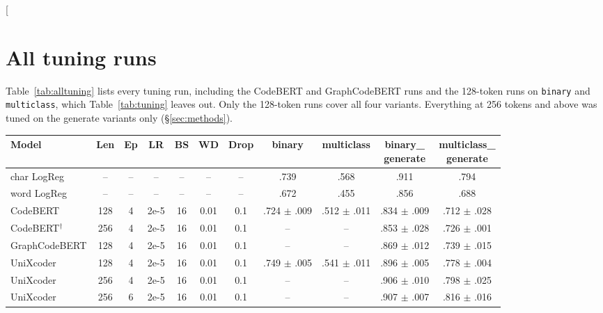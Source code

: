 \documentclass[11pt]{article}
\begin{document}
\twocolumn[{%
\section{All tuning runs}
\label{app:tuning}

Table~\ref{tab:alltuning} lists every tuning run, including the CodeBERT and GraphCodeBERT runs and the 128-token runs on \texttt{binary} and \texttt{multiclass}, which Table~\ref{tab:tuning} leaves out. Only the 128-token runs cover all four variants. Everything at 256 tokens and above was tuned on the generate variants only (\S\ref{sec:methods}).

\smallskip
{\centering
  \captionsetup{type=table}
  \small
  \setlength{\tabcolsep}{3.5pt}
  \begin{tabular}{lcccccccccc}
    \hline
    \textbf{Model} & \textbf{Len} & \textbf{Ep} & \textbf{LR} & \textbf{BS} & \textbf{WD} & \textbf{Drop} & \textbf{binary} & \textbf{multiclass} & \makecell{\textbf{binary\_}\\\textbf{generate}} & \makecell{\textbf{multiclass\_}\\\textbf{generate}} \\
    \hline
    char LogReg            & --  & -- & --   & -- & --   & --  & .739            & .568            & .911            & .794 \\
    word LogReg            & --  & -- & --   & -- & --   & --  & .672            & .455            & .856            & .688 \\
    \hline
    CodeBERT               & 128 & 4  & 2e-5 & 16 & 0.01 & 0.1 & .724 $\pm$ .009 & .512 $\pm$ .011 & .834 $\pm$ .009 & .712 $\pm$ .028 \\
    CodeBERT$^\dagger$     & 256 & 4  & 2e-5 & 16 & 0.01 & 0.1 & --              & --              & .853 $\pm$ .028 & .726 $\pm$ .001 \\
    GraphCodeBERT          & 128 & 4  & 2e-5 & 16 & 0.01 & 0.1 & --              & --              & .869 $\pm$ .012 & .739 $\pm$ .015 \\
    UniXcoder              & 128 & 4  & 2e-5 & 16 & 0.01 & 0.1 & .749 $\pm$ .005 & .541 $\pm$ .011 & .896 $\pm$ .005 & .778 $\pm$ .004 \\
    \hline
    UniXcoder              & 256 & 4  & 2e-5 & 16 & 0.01 & 0.1 & --              & --              & .906 $\pm$ .010 & .798 $\pm$ .025 \\
    UniXcoder              & 256 & 6  & 2e-5 & 16 & 0.01 & 0.1 & --              & --              & .907 $\pm$ .007 & .816 $\pm$ .016 \\

\end{tabular}}}
\end{document}
